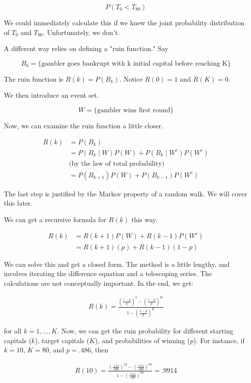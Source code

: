 \documentclass[12pt]{article}
\theoremstyle{definition}
\begin{document}
$$
P(T_0 < T_{80})
$$

We could immediately calculate this if we knew the joint probability distribution of $T_0$ and $T_{80}$. Unfortunately, we don't.

A different way relies on defining a "ruin function." Say

$$
B_k = \{\text{gambler goes bankrupt with k initial capital before reaching K}\}
$$

The ruin function is $R(k) = P(B_k)$. Notice $R(0) = 1$ and $R(K) = 0$.

We then introduce an event set.

$$
W = \{\text{gambler wins first round}\}
$$

Now, we can examine the ruin function a little closer.

\begin{align*}
  R(k) &= P(B_k) \\
  &= P(B_k \mid W)P(W) + P(B_k \mid W^c)P(W^c) \\
  &\text{(by the law of total probability)} \\
  & = P(B_{k+1})P(W) + P(B_{k-1})P(W^c)
\end{align*}

The last step is justified by the Markov property of a random walk. We will cover this later.

We can get a recursive formula for $R(k)$ this way.

\begin{align*}
  R(k) &= R(k+1)P(W) + R(k-1) P(W^c) \\
  &= R(k+1)(p) + R(k-1)(1-p)
\end{align*}


We can solve this and get a closed form. The method is a little lengthy, and involves iterating the difference equation and a telescoping series. The calculations are not conceptually important. In the end, we get:

\begin{align*}
  R(k) = \frac{(\frac{1-p}{p})^k - (\frac{1-p}{p})^K}{1- (\frac{1-p}{p})^K}
\end{align*}

for all $k = 1, \dots, K$. Now, we can get the ruin probability for different starting capitals ($k$), target capitals ($K$), and probabilities of winning ($p$). For instance, if $k =10$, $K = 80$, and $p = .486$, then

\begin{align*}
  R(10) = \frac{(\frac{.514}{.486})^{10} - (\frac{.514}{.486})^{80}}{1- (\frac{.514}{.486})^{80}} = .9914
\end{align*}
\end{document}

